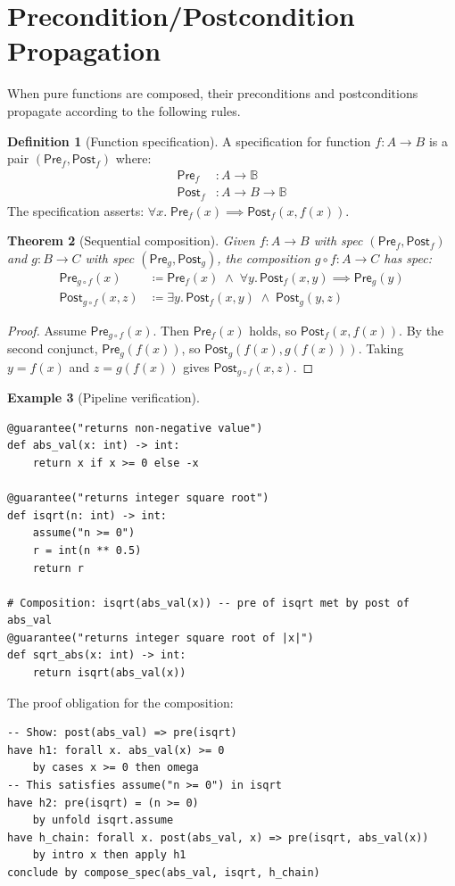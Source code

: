 \documentclass[11pt,a4paper]{report}
\theoremstyle{definition}
\newtheorem{definition}{Definition}[chapter]
\newtheorem{example}[definition]{Example}
\theoremstyle{plain}
\newtheorem{theorem}[definition]{Theorem}
\newcommand{\Bool}{\mathbb{B}}
\newcommand{\defeq}{\coloneqq}
\newcommand{\Pre}{\mathsf{Pre}}
\newcommand{\Post}{\mathsf{Post}}
\begin{document}
\section{Precondition/Postcondition Propagation}
\label{sec:prepost-prop}

When pure functions are composed, their preconditions and postconditions propagate
according to the following rules.

\begin{definition}[Function specification]
A specification for function $f : A \to B$ is a pair $(\Pre_f, \Post_f)$ where:
\begin{align}
  \Pre_f &: A \to \Bool \\
  \Post_f &: A \to B \to \Bool
\end{align}
The specification asserts: $\forall x.\; \Pre_f(x) \implies \Post_f(x, f(x))$.
\end{definition}

\begin{theorem}[Sequential composition]
\label{thm:seq-compose}
Given $f : A \to B$ with spec $(\Pre_f, \Post_f)$ and $g : B \to C$ with spec
$(\Pre_g, \Post_g)$, the composition $g \circ f : A \to C$ has spec:
\begin{align}
  \Pre_{g \circ f}(x) &\defeq \Pre_f(x) \;\wedge\; \forall y.\, \Post_f(x, y) \implies \Pre_g(y) \\
  \Post_{g \circ f}(x, z) &\defeq \exists y.\, \Post_f(x, y) \;\wedge\; \Post_g(y, z)
\end{align}
\end{theorem}
\begin{proof}
Assume $\Pre_{g \circ f}(x)$. Then $\Pre_f(x)$ holds, so $\Post_f(x, f(x))$.
By the second conjunct, $\Pre_g(f(x))$, so $\Post_g(f(x), g(f(x)))$.
Taking $y = f(x)$ and $z = g(f(x))$ gives $\Post_{g \circ f}(x, z)$.
\end{proof}

\begin{example}[Pipeline verification]
\begin{lstlisting}[style=synhopy]
@guarantee("returns non-negative value")
def abs_val(x: int) -> int:
    return x if x >= 0 else -x

@guarantee("returns integer square root")
def isqrt(n: int) -> int:
    assume("n >= 0")
    r = int(n ** 0.5)
    return r

# Composition: isqrt(abs_val(x)) -- pre of isqrt met by post of abs_val
@guarantee("returns integer square root of |x|")
def sqrt_abs(x: int) -> int:
    return isqrt(abs_val(x))
\end{lstlisting}

The proof obligation for the composition:
\begin{lstlisting}[style=proof]
-- Show: post(abs_val) => pre(isqrt)
have h1: forall x. abs_val(x) >= 0
    by cases x >= 0 then omega
-- This satisfies assume("n >= 0") in isqrt
have h2: pre(isqrt) = (n >= 0)
    by unfold isqrt.assume
have h_chain: forall x. post(abs_val, x) => pre(isqrt, abs_val(x))
    by intro x then apply h1
conclude by compose_spec(abs_val, isqrt, h_chain)
\end{lstlisting}
\end{example}
\end{document}
